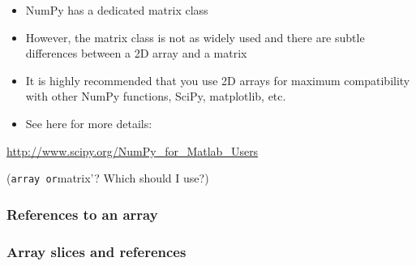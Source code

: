 \documentclass[12pt,letterpaper,twoside]{article}
\begin{document}
\begin{itemize}
\item
  NumPy has a dedicated matrix class
\item
  However, the matrix class is not as widely used and there are subtle
  differences between a 2D array and a matrix
\item
  It is highly recommended that you use 2D arrays for maximum
  compatibility with other NumPy functions, SciPy, matplotlib, etc.
\item
  See here for more details:
\end{itemize}

\url{http://www.scipy.org/NumPy_for_Matlab_Users}

(\texttt{array\textquotesingle{}\ or}matrix'? Which should I use?)

\hypertarget{references-to-an-array}{%
\subsubsection{References to an array}\label{references-to-an-array}}

\begin{python}
\begin{Highlighting}[]
\OperatorTok{=}\OperatorTok{=}\NormalTok{,}\NormalTok{)}
\end{Highlighting}
\end{python}

\begin{python}
\begin{Highlighting}[]
\OperatorTok{=}
\NormalTok{b[}\NormalTok{,}\NormalTok{] }\OperatorTok{=} 
\end{Highlighting}
\end{python}

\begin{python}
\begin{Highlighting}[]
\end{Highlighting}
\end{python}

\hypertarget{array-slices-and-references}{%
\subsubsection{Array slices and
references}\label{array-slices-and-references}}
\end{document}
